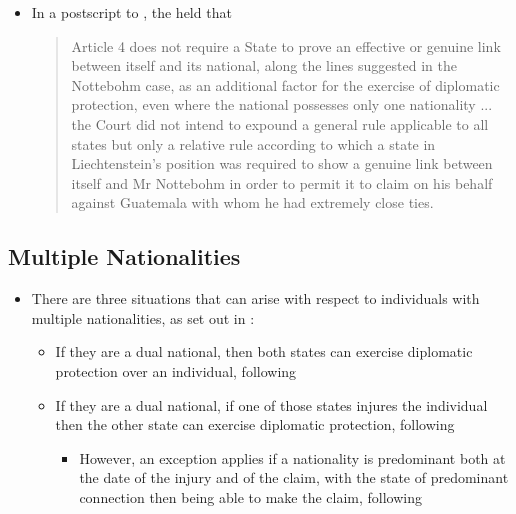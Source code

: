 \begin{itemize}
    \item In a postscript to , the  held that
    \begin{quote}
        Article 4 does not require a State to prove an effective or genuine link between itself and its national, along the lines suggested in the Nottebohm case, as an additional factor for the exercise of diplomatic protection, even where the national possesses only one nationality ... the Court did not intend to expound a general rule applicable to all states but only a relative rule according to which a state in Liechtenstein's position was required to show a genuine link between itself and Mr Nottebohm in order to permit it to claim on his behalf against Guatemala with whom he had extremely close ties.
    \end{quote}
\end{itemize}

\subsection{Multiple Nationalities}
\begin{itemize}
    \item There are three situations that can arise with respect to individuals with multiple nationalities, as set out in :
    \begin{itemize}
        \item If they are a dual national, then both states can exercise diplomatic protection over an individual, following 
        \item If they are a dual national, if one of those states injures the individual then the other state can exercise diplomatic protection, following 
        \begin{itemize}
            \item However, an exception applies if a nationality is predominant both at the date of the injury and of the claim, with the state of predominant connection then being able to make the claim, following 
        \end{itemize}
    \end{itemize}
\end{itemize}

